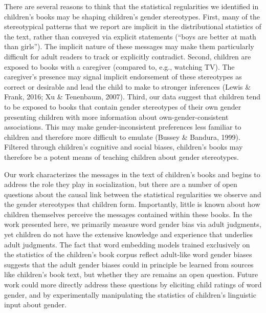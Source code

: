 \documentclass[
  english,
  ,man,floatsintext]{apa6}
\begin{document}
There are several reasons to think that the statistical regularities we identified in children's books may be shaping children's gender stereotypes. First, many of the stereotypical patterns that we report are implicit in the distributional statistics of the text, rather than conveyed via explicit statements (\enquote{boys are better at math than girls}). The implicit nature of these messages may make them particularly difficult for adult readers to track or explicitly contradict. Second, children are exposed to books with a caregiver (compared to, e.g., watching TV). The caregiver's presence may signal implicit endorsement of these stereotypes as correct or desirable and lead the child to make to stronger inferences (Lewis \& Frank, 2016; Xu \& Tenenbaum, 2007). Third, our data suggest that children tend to be exposed to books that contain gender stereotypes of their own gender presenting children with more information about own-gender-consistent associations. This may make gender-inconsistent preferences less familiar to children and therefore more difficult to emulate (Bussey \& Bandura, 1999). Filtered through children's cognitive and social biases, children's books may therefore be a potent means of teaching children about gender stereotypes.

Our work characterizes the messages in the text of children's books and begins to address the role they play in socialization, but there are a number of open questions about the causal link between the statistical regularities we observe and the gender stereotypes that children form. Importantly, little is known about how children themselves perceive the messages contained within these books. In the work presented here, we primarily measure word gender bias via adult judgments, yet children do not have the extensive knowledge and experience that underlies adult judgments. The fact that word embedding models trained exclusively on the statistics of the children's book corpus reflect adult-like word gender biases suggests that the adult gender biases could in principle be learned from sources like children's book text, but whether they are remains an open question. Future work could more directly address these questions by eliciting child ratings of word gender, and by experimentally manipulating the statistics of children's linguistic input about gender.
\end{document}
